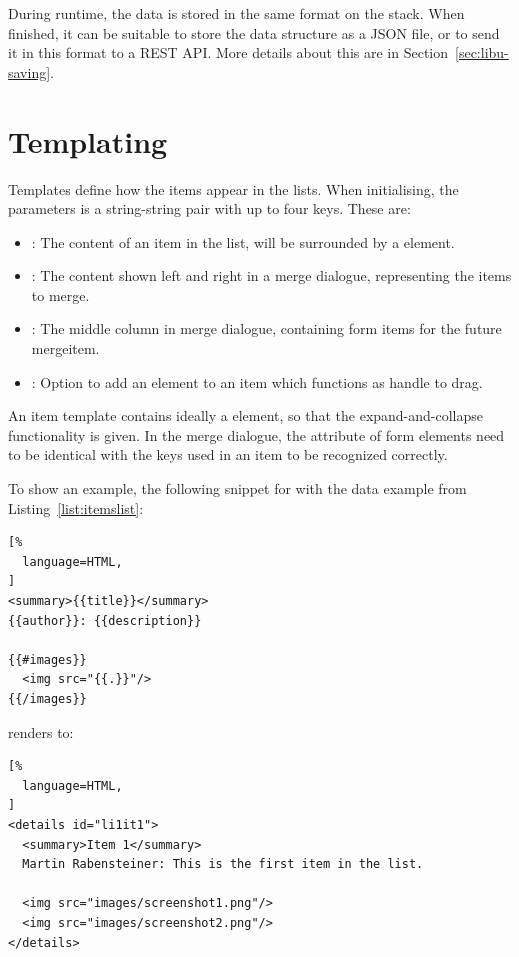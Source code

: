 During runtime, the data is stored in the same format on the stack. When
finished, it can be suitable to store the data structure as a JSON file,
or to send it in this format to a REST API. More details about this are
in Section~\ref{sec:libu-saving}.







\section{Templating}
\label{sec:libu-templates}

Templates define how the items appear in the lists. When initialising,
the  parameters is a string-string pair with up to four
keys. These are:
\begin{itemize}
  \item {}: The content of an item in the list, will be
    surrounded by a  element.
  \item {}: The content shown left and right in a merge
    dialogue, representing the items to merge.
  \item {}: The middle column in merge dialogue, containing
    form items for the future mergeitem.
  \item {}: Option to add an element to an item which
    functions as handle to drag.
\end{itemize}
An item template contains ideally a  element, so that the
expand-and-collapse functionality is given. In the merge dialogue, the
 attribute of form elements need to be identical with the
keys used in an item to be recognized correctly. 


To show an example, the following snippet for  with the data
example from Listing~\ref{list:itemslist}:
\begin{samepage}
\begin{lstlisting}[%
  language=HTML,
]
<summary>{{title}}</summary>
{{author}}: {{description}}

{{#images}}
  <img src="{{.}}"/>
{{/images}}
\end{lstlisting}
\end{samepage}

renders to:

\begin{samepage}
\begin{lstlisting}[%
  language=HTML,
]
<details id="li1it1">
  <summary>Item 1</summary>
  Martin Rabensteiner: This is the first item in the list.

  <img src="images/screenshot1.png"/>
  <img src="images/screenshot2.png"/>
</details>
\end{lstlisting}
\end{samepage}






